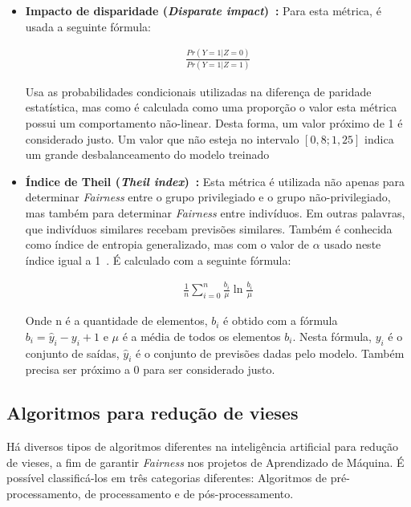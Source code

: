 \documentclass[Portugues,Final]{ic-tese-v3}
\begin{document}
\begin{itemize}
\item \textbf{Impacto de disparidade (\textit{Disparate impact})~\cite{Biswas_2020}:} Para esta métrica, é usada a seguinte fórmula:

\begin{align*}
\frac{Pr(Y=1|Z=0)}{Pr(Y=1|Z=1)}
\end{align*}

Usa as probabilidades condicionais utilizadas na diferença de paridade estatística, mas como é calculada como uma proporção o valor esta métrica possui um comportamento não-linear. Desta forma, um valor próximo de 1 é considerado justo. Um valor que não esteja no intervalo $\left[0,8; 1,25 \right]$ indica um grande desbalanceamento do modelo treinado~\cite{Feldman_2015}

\item \textbf{Índice de Theil (\textit{Theil index})~\cite{Speicher_2018}:} Esta métrica é utilizada não apenas para determinar \textit{Fairness} entre o grupo privilegiado e o grupo não-privilegiado, mas também para determinar \textit{Fairness} entre indivíduos. Em outras palavras, que indivíduos similares recebam previsões similares. Também é conhecida como índice de entropia generalizado, mas com o valor de $\alpha$ usado neste índice igual a 1~\cite{Speicher_2018}. É calculado com a seguinte fórmula:

\begin{align*}
\frac{1}{n}\sum^{n}_{i=0}\frac{b_i}{\mu}\ln{\frac{b_i}{\mu}}
\end{align*}

Onde n é a quantidade de elementos, $b_i$ é obtido com a fórmula $b_i = \hat{y}_i - y_i + 1$ e $\mu$ é a média de todos os elementos $b_i$. Nesta fórmula, $y_i$ é o conjunto de saídas, $\hat{y}_i$ é o conjunto de previsões dadas pelo modelo. Também precisa ser próximo a 0 para ser considerado justo.

\end{itemize}

\subsection{Algoritmos para redução de vieses}
\label{sec:FairnessAlgorithms}

Há diversos tipos de algoritmos diferentes na inteligência artificial para redução de vieses, a fim de garantir \textit{Fairness} nos projetos de Aprendizado de Máquina. É possível classificá-los em três categorias diferentes: Algoritmos de pré-processamento, de processamento e de pós-processamento.
\end{document}
